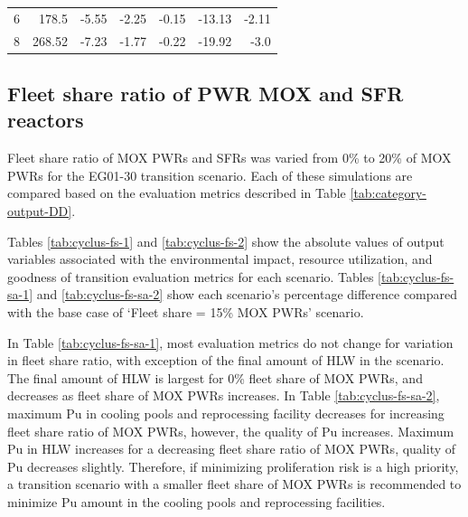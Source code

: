 \begin{table}[H]
\begin{tabularx}{\textwidth}{R|RRRRRR}
6  & 178.5            & -5.55                          & -2.25         & -0.15                       & -13.13            & -2.11                           \\
8  & 268.52           & -7.23                          & -1.77         & -0.22                       & -19.92            & -3.0                           \\ \hline
        \end{tabularx}
        \end{table}

\subsection{Fleet share ratio of PWR MOX and SFR reactors}

Fleet share ratio of \gls{MOX} \glspl{PWR} and \glspl{SFR}
was varied from 0\% to 20\% of \gls{MOX} \glspl{PWR} for the 
\Cyclus EG01-30 transition scenario. 
Each of these simulations are compared based on the evaluation 
metrics described in Table \ref{tab:category-output-DD}. 

Tables \ref{tab:cyclus-fs-1} and \ref{tab:cyclus-fs-2} show 
the absolute values of 
output variables associated with the environmental impact, 
resource utilization, and goodness of transition evaluation 
metrics for each scenario. 
Tables \ref{tab:cyclus-fs-sa-1} and \ref{tab:cyclus-fs-sa-2} 
show each scenario's percentage 
difference compared with the base case of `Fleet share = 15\% 
\gls{MOX} \glspl{PWR}' scenario. 

In Table \ref{tab:cyclus-fs-sa-1}, most evaluation metrics do not change 
for variation in fleet share ratio, with exception of the final 
amount of HLW in the scenario. 
The final amount of HLW is largest for 0\% fleet share of \gls{MOX} 
\glspl{PWR}, and decreases as fleet share of \gls{MOX} \glspl{PWR} 
increases. 
In Table \ref{tab:cyclus-fs-sa-2}, maximum Pu in cooling pools and 
reprocessing facility 
decreases for increasing fleet share ratio of \gls{MOX} \glspl{PWR}, 
however, the quality of Pu increases. 
Maximum Pu in HLW increases for a decreasing fleet share ratio
of \gls{MOX} \glspl{PWR}, quality of Pu decreases slightly.
Therefore, if minimizing proliferation risk is a high priority, 
a transition scenario 
with a smaller fleet share of \gls{MOX} \glspl{PWR} is recommended
to minimize Pu amount in the cooling pools and reprocessing facilities. 

